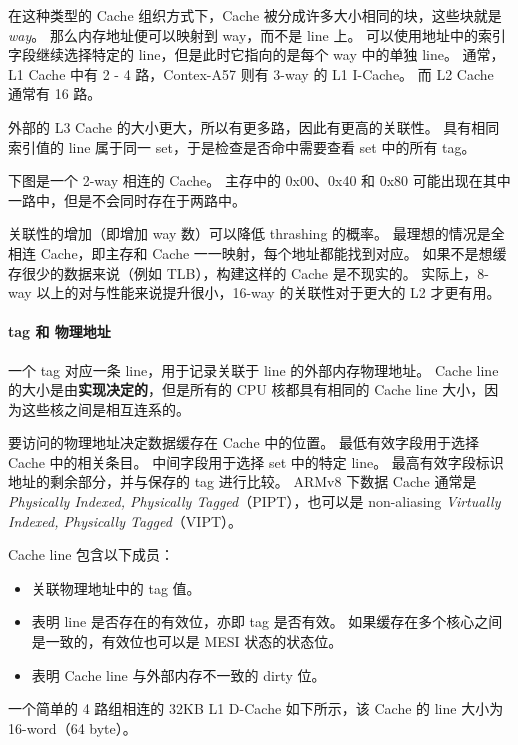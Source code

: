 在这种类型的 Cache 组织方式下，Cache 被分成许多大小相同的块，这些块就是 \textit{way}。
那么内存地址便可以映射到 way，而不是 line 上。
可以使用地址中的索引字段继续选择特定的 line，但是此时它指向的是每个 way 中的单独 line。
通常，L1 Cache 中有 2 - 4 路，Contex-A57 则有 3-way 的 L1 I-Cache。
而 L2 Cache 通常有 16 路。

外部的 L3 Cache 的大小更大，所以有更多路，因此有更高的关联性。
具有相同索引值的 line 属于同一 set，于是检查是否命中需要查看 set 中的所有 tag。

下图是一个 2-way 相连的 Cache。
主存中的 0x00、0x40 和 0x80 可能出现在其中一路中，但是不会同时存在于两路中。


关联性的增加（即增加 way 数）可以降低 thrashing 的概率。
最理想的情况是全相连 Cache，即主存和 Cache 一一映射，每个地址都能找到对应。
如果不是想缓存很少的数据来说（例如 TLB），构建这样的 Cache 是不现实的。
实际上，8-way 以上的对与性能来说提升很小，16-way 的关联性对于更大的 L2 才更有用。

\paragraph*{tag 和 物理地址}

一个 tag 对应一条 line，用于记录关联于 line 的外部内存物理地址。
Cache line 的大小是由\textbf{实现决定的}，但是所有的 CPU 核都具有相同的 Cache line 大小，因为这些核之间是相互连系的。

要访问的物理地址决定数据缓存在 Cache 中的位置。
最低有效字段用于选择 Cache 中的相关条目。
中间字段用于选择 set 中的特定 line。
最高有效字段标识地址的剩余部分，并与保存的 tag 进行比较。
ARMv8 下数据 Cache 通常是 \textit{Physically Indexed, Physically Tagged}（PIPT），也可以是 non-aliasing \textit{Virtually Indexed, Physically Tagged}（VIPT）。

Cache line 包含以下成员：

\begin{itemize}
  \item 关联物理地址中的 tag 值。
  \item 表明 line 是否存在的有效位，亦即 tag 是否有效。
    如果缓存在多个核心之间是一致的，有效位也可以是 MESI 状态的状态位。
  \item 表明 Cache line 与外部内存不一致的 dirty 位。
\end{itemize}

一个简单的 4 路组相连的 32KB L1 D-Cache 如下所示，该 Cache 的 line 大小为 16-word（64 byte）。

